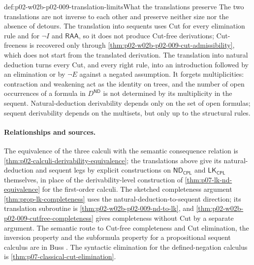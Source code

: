 \begin{hbwarning}{def:p02-w02b-p02-009-translation-limits}{What the translations preserve}
The two translations are not inverse to each other and preserve neither
size nor the absence of detours.  The translation into sequents uses Cut for
every elimination rule and for \(\neg I\) and \(\mathsf{RAA}\), so it does
not produce Cut-free derivations; Cut-freeness is recovered only through
\cref{thm:p02-w02b-p02-009-cut-admissibility}, which does not start from the
translated derivation.  The translation into natural deduction turns every
Cut, and every right rule, into an introduction followed by an elimination
or by \(\neg E\) against a negated assumption.  It forgets multiplicities:
contraction and weakening act as the identity on trees, and the number of
open occurrences of a formula in \(D^{\mathsf{ND}}\) is not determined by
its multiplicity in the sequent.  Natural-deduction derivability depends only on
the set of open formulas; sequent derivability depends on the multisets, but
only up to the structural rules.
\end{hbwarning}

\paragraph{Relationships and sources.}
The equivalence of the three calculi with the semantic consequence relation
is \cref{thm:p02-calculi-derivability-equivalence}; the translations above
give its natural-deduction and sequent legs by explicit constructions on
\(\mathsf{ND}_{\mathsf{CPL}}\) and \(\mathsf{LK}_{\mathsf{CPL}}\) themselves,
in place of the derivability-level construction of
\cref{thm:p07-lk-nd-equivalence} for the first-order calculi.  The sketched
completeness argument \cref{thm:prop-lk-completeness} uses the
natural-deduction-to-sequent direction; its translation subroutine is
\cref{thm:p02-w02b-p02-009-nd-to-lk}, and
\cref{thm:p02-w02b-p02-009-cutfree-completeness} gives completeness without
Cut by a separate argument.  The semantic route to Cut-free completeness and
Cut elimination, the inversion property and the subformula property for a
propositional sequent calculus are in Buss
\cite[Secs.~1.2.4--1.2.11, pp.~13--16]{Buss1998Intro}.  The syntactic
elimination for the defined-negation calculus is
\cref{thm:p07-classical-cut-elimination}.
